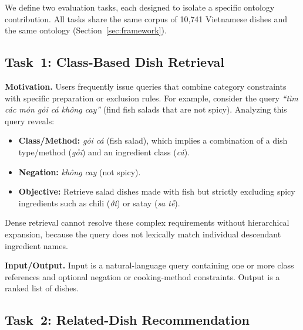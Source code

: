 \label{sec:tasks}

We define two evaluation tasks, each designed to isolate a specific ontology contribution. All tasks share the same corpus of 10{,}741 Vietnamese dishes and the same ontology (Section~\ref{sec:framework}).

\subsection{Task~1: Class-Based Dish Retrieval}
\label{ssec:task1}

\textbf{Motivation.} Users frequently issue queries that combine category constraints with specific preparation or exclusion rules. For example, consider the query \textit{``tìm các món gỏi cá không cay''} (find fish salads that are not spicy). Analyzing this query reveals:
\begin{itemize}
    \item \textbf{Class/Method:} \textit{gỏi cá} (fish salad), which implies a combination of a dish type/method (\textit{gỏi}) and an ingredient class (\textit{cá}).
    \item \textbf{Negation:} \textit{không cay} (not spicy).
    \item \textbf{Objective:} Retrieve salad dishes made with fish but strictly excluding spicy ingredients such as chili (\textit{ớt}) or satay (\textit{sa tế}).
\end{itemize}
Dense retrieval cannot resolve these complex requirements without hierarchical expansion, because the query does not lexically match individual descendant ingredient names.

\textbf{Input/Output.} Input is a natural-language query containing one or more class references and optional negation or cooking-method constraints. Output is a ranked list of dishes.




\subsection{Task~2: Related-Dish Recommendation}
\label{ssec:task2}

